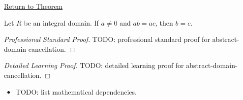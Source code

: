 \newpage
{}
\label{prf:abstract-domain-cancellation}

\begin{remark*}[Return]
\hyperref[prop:abstract-domain-cancellation]{Return to Theorem}
\end{remark*}

\begin{proposition*}
Let $R$ be an integral domain.  If $a\neq 0$ and $ab=ac$, then $b=c$.
\end{proposition*}

\begin{proof}[Professional Standard Proof]
\LRAProofBodyStart
TODO: professional standard proof for abstract-domain-cancellation.
\end{proof}

\begin{proof}[Detailed Learning Proof]
\LRAProofBodyStart
TODO: detailed learning proof for abstract-domain-cancellation.
\end{proof}

\begin{remark*}
\end{remark*}

\begin{dependencies}
\begin{itemize}
  \item TODO: list mathematical dependencies.
\end{itemize}
\end{dependencies}

\clearpage
